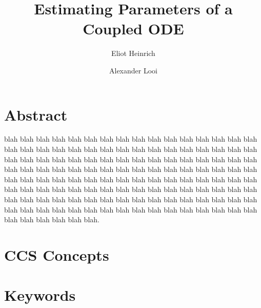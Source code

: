 \documentclass[twocolumn, 9pt]{article}
\begin{document}
\title{Estimating Parameters of a Coupled ODE}

\author[1]{Eliot Heinrich}
\author[2]{Alexander Looi} 

\twocolumn
\maketitle
\section*{Abstract}
\indent{} blah blah blah blah blah blah blah blah blah blah blah blah blah blah blah blah blah blah blah blah blah blah blah blah blah blah blah blah blah blah blah blah blah blah blah blah blah blah blah blah blah blah blah blah blah blah blah blah blah blah blah blah blah blah blah blah blah blah blah blah blah blah blah blah blah blah blah blah blah blah blah blah blah blah blah blah blah blah blah blah blah blah blah blah blah blah blah blah blah blah blah blah blah blah blah blah blah blah blah blah blah blah blah blah blah blah blah blah blah blah blah blah blah blah blah blah blah blah blah blah blah blah blah blah blah blah blah blah blah blah blah blah blah blah. 

\section*{CCS Concepts}
\section*{Keywords}
\end{document}
